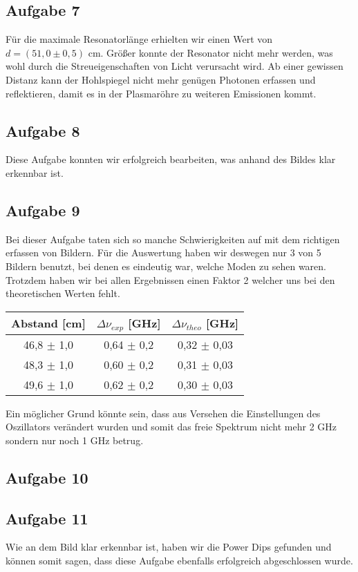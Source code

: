 \subsection*{Aufgabe 7}
Für die maximale Resonatorlänge erhielten wir einen Wert von $d = (51,0\pm 0,5)$ cm. Größer konnte der Resonator nicht mehr werden, was wohl durch die Streueigenschaften von Licht verursacht wird. Ab einer gewissen Distanz kann der Hohlspiegel nicht mehr genügen Photonen erfassen und reflektieren, damit es in der Plasmaröhre zu weiteren Emissionen kommt.

\subsection*{Aufgabe 8}
Diese Aufgabe konnten wir erfolgreich bearbeiten, was anhand des Bildes klar erkennbar ist.

\subsection*{Aufgabe 9}
Bei dieser Aufgabe taten sich so manche Schwierigkeiten auf mit dem richtigen erfassen von Bildern. Für die Auswertung haben wir deswegen nur 3 von 5 Bildern benutzt, bei denen es eindeutig war, welche Moden zu sehen waren. Trotzdem haben wir bei allen Ergebnissen einen Faktor 2 welcher uns bei den theoretischen Werten fehlt.

\begin{center}
\begin{tabular}{c | c | c}
Abstand [cm] & $\Delta \nu_{exp}$ [GHz] & $\Delta \nu_{theo}$ [GHz]\\ \hline
46,8 $\pm$ 1,0 & 0,64 $\pm$ 0,2 & 0,32 $\pm$ 0,03\\ 
48,3 $\pm$ 1,0 & 0,60 $\pm$ 0,2 & 0,31 $\pm$ 0,03\\
49,6 $\pm$ 1,0 & 0,62 $\pm$ 0,2 & 0,30 $\pm$ 0,03\\
\end{tabular}
\end{center}

Ein möglicher Grund könnte sein, dass aus Versehen die Einstellungen des Oszillators verändert wurden und somit das freie Spektrum nicht mehr 2 GHz sondern nur noch 1 GHz betrug. 

\subsection*{Aufgabe 10}

\subsection*{Aufgabe 11}
Wie an dem Bild klar erkennbar ist, haben wir die Power Dips gefunden und können somit sagen, dass diese Aufgabe ebenfalls erfolgreich abgeschlossen wurde.
